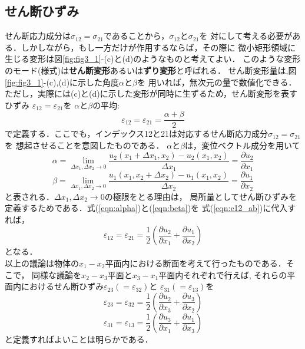 \documentclass[10pt,a4j]{jbook}
\begin{document}
\subsection{せん断ひずみ}
せん断応力成分は$\sigma_{12}=\sigma_{21}$であることから，$\sigma_{12}$と$\sigma_{21}$を
対にして考える必要がある．しかしながら，もし一方だけが作用するならば，その際に
微小矩形領域に生じる変形は図\ref{fig:fig3_1}-(c)と(d)のようなものと考えてよい．
このような変形のモード(様式)は{\bf せん断変形}あるいは{\bf ずり変形}と呼ばれる．
せん断変形量は,図\ref{fig:fig3_1}-(c),(d)に示した角度$\alpha$と$\beta$を
用いれば，無次元の量で数値化できる．
ただし，実際には(c)と(d)に示した変形が同時に生ずるため，せん断変形を表すひずみ
$\varepsilon_{12}=\varepsilon_{21}$を
$\alpha$と$\beta$の平均:
\begin{equation}
	\varepsilon_{12}=\varepsilon_{21}=\frac{\alpha+\beta}{2}
	\label{eqn:e12_ab}
\end{equation}
で定義する．ここでも，インデックス12と21は対応するせん断応力成分$\sigma_{12}=\sigma_{21}$を
想起させることを意図したものである．
$\alpha$と$\beta$は，変位ベクトル成分を用いて
\begin{equation}
	\alpha=
	\lim_{\Delta x_1,\Delta x_2 \rightarrow 0}
	\frac{u_2(x_1+\Delta x_1,x_2)-u_2(x_1,x_2)}{\Delta x_1}
	=\frac{\partial u_2}{\partial x_1}
	\label{eqn:alpha}
\end{equation}
\begin{equation}
	\beta=
	\lim_{\Delta x_1,\Delta x_2 \rightarrow 0}
	\frac{u_1(x_1,x_2+\Delta x_2)-u_1(x_1,x_2)}{\Delta x_2}
	=\frac{\partial u_1}{\partial x_2}
	\label{eqn:beta}
\end{equation}
と表される．$\Delta x_1,\Delta x_2\rightarrow 0$の極限をとる理由は，
局所量としてせん断ひずみを定義するためである．式(\ref{eqn:alpha})と(\ref{eqn:beta})を
式(\ref{eqn:e12_ab})に代入すれば，
\begin{equation}
	\varepsilon_{12}=
	\varepsilon_{21}=
	\frac{1}{2}
	\left(
	\frac{\partial u_2}{\partial x_1}
	+
	\frac{\partial u_1}{\partial x_2}
	\right)
	\label{eqn:def_e12}
\end{equation}
となる．\\

以上の議論は物体の$x_1-x_2$平面内における断面を考えて行ったものである．そこで，
同様な議論を$x_2-x_3$平面と$x_3-x_1$平面内それぞれで行えば,
それらの平面内におけるせん断ひずみ$\varepsilon_{23}(=\varepsilon_{32})$と
$\varepsilon_{31}(=\varepsilon_{13})$を
\begin{equation}
	\varepsilon_{23}=
	\varepsilon_{32}=
	\frac{1}{2}
	\left(
	\frac{\partial u_2}{\partial x_3}
	+
	\frac{\partial u_3}{\partial x_2}
	\right)
	\label{eqn:def_e23}
\end{equation}
\begin{equation}
	\varepsilon_{31}=
	\varepsilon_{13}=
	\frac{1}{2}
	\left(
	\frac{\partial u_3}{\partial x_1}
	+
	\frac{\partial u_1}{\partial x_3}
	\right)
	\label{eqn:def_e31}
\end{equation}
と定義すればよいことは明らかである．
\end{document}
